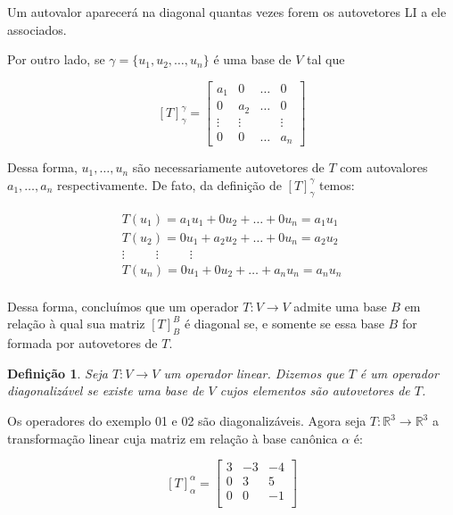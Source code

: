\documentclass[oneside,a4paper,12pt]{article}
\newtheorem{definition}{Definição}[section]
\begin{document}
Um autovalor aparecerá na diagonal quantas vezes forem os autovetores LI a ele associados.

Por outro lado, se $\gamma = \{ u_1, u_2, \dots, u_n  \}$ é uma base de $V$ tal que

$$[T]_{\gamma}^{\gamma} = \left[
\begin{array}{cccc}
a_1	&	0		&	\dots	&	0\\
0		&	a_2	&	\dots	&	0 \\
\vdots	&	\vdots	&			&	\vdots	\\
0		&	0		&	\dots	&	a_n
\end{array}
\right]$$

Dessa forma, $u_1, \dots, u_n$ são necessariamente autovetores de $T$ com autovalores $a_1, \dots, a_n$ respectivamente. De fato, da definição de $[T]_{\gamma}^{\gamma}$ temos:

\begin{eqnarray*}
	T(u_1) = a_1 u_1 + 0u_2 + \dots + 0u_n = a_1 u_1\\
	T(u_2) = 0u_1 + a_2 u_2 + \dots + 0u_n = a_2 u_2\\
	\vdots \hspace{30pt} \vdots \hspace{30pt} \vdots \hspace{40pt} \\
	T(u_n) = 0u_1 + 0u_2 + \dots + a_n u_n = a_n u_n\\
\end{eqnarray*}

Dessa forma, concluímos que um operador $T:V \rightarrow V$ admite uma base $B$ em relação à qual sua matriz $[T]_{B}^{B}$ é diagonal se, e somente se essa base $B$ for formada por autovetores de $T$.

\begin{definition}
	Seja $T:V \rightarrow V$ um operador linear. Dizemos que $T$ é um operador \emph{diagonalizável} se existe uma base de $V$ cujos elementos são autovetores de $T$.
\end{definition}

Os operadores do exemplo 01 e 02 são diagonalizáveis. Agora seja $T: \mathbb{R}^3 \rightarrow \mathbb{R}^3$ a transformação linear cuja matriz em relação à base canônica $\alpha$ é:

$$[T]^{\alpha}_{\alpha} = \left[
\begin{array}{ccc}
3	&	-3	&	-4\\
0	&	3	&	5 \\
0	&	0	&	-1	\\
\end{array}
\right]$$
\end{document}
